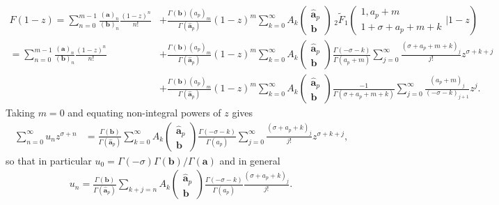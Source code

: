 \documentclass[12pt]{article}
\numberwithin{equation}{section}
\begin{document}
\begin{align*}
F(1-z)=\sum_{n=0}^{m-1} \frac{(\mathbf a)_n}{(\mathbf b)_n}\frac{(1-z)^n}{n!}&+\frac{\Gamma(\mathbf{b})(a_p)_m}{\Gamma(\hat{\mathbf{a}}_p)} (1-z)^m \sum_{k=0}^{\infty} {A_k\left(\begin{array}{c} \hat{\mathbf{a}}_p \\ \mathbf{b} \end{array}\right)}\,{} _2\tilde{F}_1\left( \begin{array}{c} 1,a_p+m \\ 1+\sigma+a_p+m+k \end{array} \Big| 1-z\right)\\
=\sum_{n=0}^{m-1} \frac{(\mathbf a)_n}{(\mathbf b)_n}\frac{(1-z)^n}{n!}&+\frac{\Gamma(\mathbf{b})(a_p)_m}{\Gamma(\hat{\mathbf{a}}_p)} (1-z)^m \sum_{k=0}^{\infty} {A_k\left(\begin{array}{c} \hat{\mathbf{a}}_p \\ \mathbf{b} \end{array}\right)}\frac{\Gamma (-\sigma-k)}{\Gamma (a_p+m)} \sum_{j=0}^{\infty} \frac{(\sigma+a_p+m+k)_j}{j!}z^{\sigma+k+j}\\
&+\frac{\Gamma(\mathbf{b})(a_p)_m}{\Gamma(\hat{\mathbf{a}}_p)} (1-z)^m \sum_{k=0}^{\infty} {A_k\left(\begin{array}{c} \hat{\mathbf{a}}_p \\ \mathbf{b} \end{array}\right)} \frac{-1}{\Gamma
	\left(\sigma+a_p+m+k\right)} \sum_{j=0}^{\infty} \frac{(a_p+m)_j}{(-\sigma-k)_{j+1}} z^j.
\end{align*}
Taking $m=0$ and equating non-integral powers of $z$ gives
\begin{align*}
\sum_{n=0}^\infty u_n z^{\sigma + n} &= \frac{\Gamma(\mathbf{b})}{\Gamma(\hat{\mathbf{a}}_p)} \sum_{k=0}^{\infty} {A_k\left(\begin{array}{c} \hat{\mathbf{a}}_p \\ \mathbf{b} \end{array}\right)}\frac{\Gamma (-\sigma-k)}{\Gamma (a_p)} \sum_{j=0}^\infty \frac{(\sigma+a_p+k)_j}{j!} z^{\sigma+k+j}\text{,}
\end{align*}
so that in particular $u_0=\Gamma(-\sigma)\Gamma(\mathbf b) / \Gamma (\mathbf a)$ and in general
\begin{align*}
u_n=\frac{\Gamma(\mathbf{b})}{\Gamma(\hat{\mathbf{a}}_p)} \sum_{k+j=n}{A_k\left(\begin{array}{c} \hat{\mathbf{a}}_p \\ \mathbf{b} \end{array}\right)}\frac{\Gamma (-\sigma-k)}{\Gamma (a_p)} \frac{(\sigma+a_p+k)_j}{j!}\text{.}
\end{align*}
\end{document}
